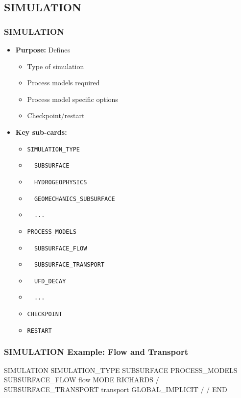 \subsection{SIMULATION}

\begin{frame}\frametitle{SIMULATION}

\begin{itemize}
\item[] \textbf{Purpose:} Defines 
\begin{itemize}
  \item Type of simulation
  \item Process models required
  \item Process model specific options
  \item Checkpoint/restart
\end{itemize}
\begin{comment}
\item[] \textbf{Example uses:}
\begin{itemize}
  \item 
\end{itemize}
\end{comment}
\item[] \textbf{Key sub-cards:}
\begin{itemize}
\item[] \verb|SIMULATION_TYPE|
\item[] \verb|  SUBSURFACE|
\item[] \verb|  HYDROGEOPHYSICS|
\item[] \verb|  GEOMECHANICS_SUBSURFACE|
\item[] \verb|  ...|
\item[] \verb|PROCESS_MODELS|
\item[] \verb|  SUBSURFACE_FLOW|
\item[] \verb|  SUBSURFACE_TRANSPORT|
\item[] \verb|  UFD_DECAY|
\item[] \verb|  ...|
\item[] \verb|CHECKPOINT|
\item[] \verb|RESTART|
\end{itemize}
\end{itemize}

\end{frame}

\begin{frame}[fragile]\frametitle{SIMULATION Example: Flow and Transport}

\begin{semiverbatim}
SIMULATION
  SIMULATION_TYPE SUBSURFACE
  PROCESS_MODELS
    SUBSURFACE_FLOW flow
      MODE RICHARDS
    /
    SUBSURFACE_TRANSPORT transport
      GLOBAL_IMPLICIT
    /
  /
END
\end{semiverbatim}

\end{frame}

